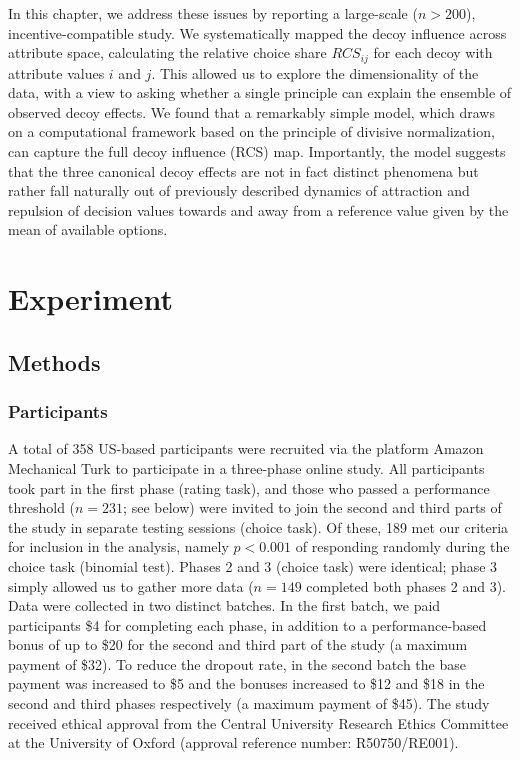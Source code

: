 \documentclass[a4paper, nobind]{templates/ociamthesis}
\begin{document}
In this chapter, we address these issues by reporting a large-scale (\(n>200\)), incentive-compatible study. We systematically mapped the decoy influence across attribute space, calculating the relative choice share \(RCS_{ij}\) for each decoy with attribute values \(i\) and \(j\). This allowed us to explore the dimensionality of the data, with a view to asking whether a single principle can explain the ensemble of observed decoy effects. We found that a remarkably simple model, which draws on a computational framework based on the principle of divisive normalization, can capture the full decoy influence (RCS) map. Importantly, the model suggests that the three canonical decoy effects are not in fact distinct phenomena but rather fall naturally out of previously described dynamics of attraction and repulsion of decision values towards and away from a reference value given by the mean of available options.

\hypertarget{experiment}{%
\section{Experiment}\label{experiment}}

\hypertarget{methods}{%
\subsection{Methods}\label{methods}}

\hypertarget{participants}{%
\subsubsection{Participants}\label{participants}}

A total of 358 US-based participants were recruited via the platform Amazon Mechanical Turk to participate in a three-phase online study. All participants took part in the first phase (rating task), and those who passed a performance threshold (\(n=231\); see below) were invited to join the second and third parts of the study in separate testing sessions (choice task). Of these, 189 met our criteria for inclusion in the analysis, namely \(p<0.001\) of responding randomly during the choice task (binomial test). Phases 2 and 3 (choice task) were identical; phase 3 simply allowed us to gather more data (\(n=149\) completed both phases 2 and 3). Data were collected in two distinct batches. In the first batch, we paid participants \$4 for completing each phase, in addition to a performance-based bonus of up to \$20 for the second and third part of the study (a maximum payment of \$32). To reduce the dropout rate, in the second batch the base payment was increased to \$5 and the bonuses increased to \$12 and \$18 in the second and third phases respectively (a maximum payment of \$45). The study received ethical approval from the Central University Research Ethics Committee at the University of Oxford (approval reference number: R50750/RE001).
\end{document}
